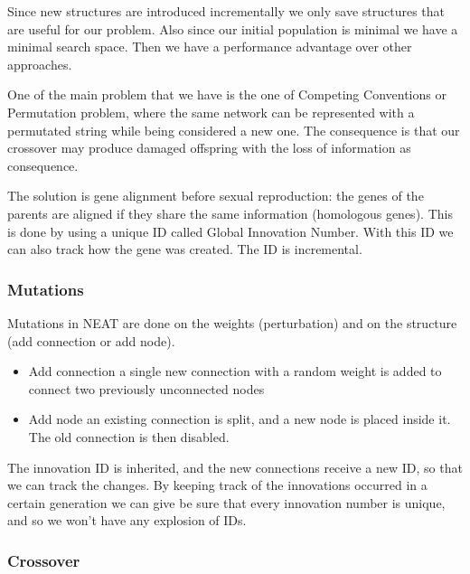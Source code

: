 \vspace{10pt}

Since new structures are introduced incrementally we only save structures that are useful for our problem. Also since our initial population is minimal we have a minimal search space. Then we have a performance advantage over other approaches. 

\vspace{10pt}

One of the main problem that we have is the one of Competing Conventions or Permutation problem, where the same network can be represented with a permutated string while being considered a new one. The consequence is that our crossover may produce damaged offspring with the loss of information as consequence. 

\vspace{10pt}

The solution is gene alignment before sexual reproduction: the genes of the parents are aligned if they share the same information (homologous genes). This is done by using a unique ID called Global Innovation Number. With this ID we can also track how the gene was created. The ID is incremental. 

\subsubsection{Mutations}

Mutations in NEAT are done on the weights (perturbation) and on the structure (add connection or add node). 

\begin{itemize}
    \item Add connection \ra a single new connection with a random weight is added to connect two previously unconnected nodes
    \item Add node \ra an existing connection is split, and a new node is placed inside it. The old connection is then disabled. 
\end{itemize}

The innovation ID is inherited, and the new connections receive a new ID, so that we can track the changes. By keeping track of the innovations occurred in a certain generation we can give be sure that every innovation number is unique, and so we won't have any explosion of IDs. 

\subsubsection{Crossover}

